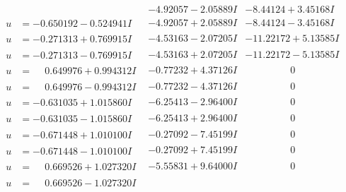 \documentclass[1p]{elsarticle_modified}
\theoremstyle{definition}
\begin{document}
$$\begin{array}{c|c|c}
 & -4.92057 - 2.05889 I & -8.44124 + 3.45168 I \\ \hline\begin{aligned}
u &= -0.650192 - 0.524941 I\end{aligned}
 & -4.92057 + 2.05889 I & -8.44124 - 3.45168 I \\ \hline\begin{aligned}
u &= -0.271313 + 0.769915 I\end{aligned}
 & -4.53163 - 2.07205 I & -11.22172 + 5.13585 I \\ \hline\begin{aligned}
u &= -0.271313 - 0.769915 I\end{aligned}
 & -4.53163 + 2.07205 I & -11.22172 - 5.13585 I \\ \hline\begin{aligned}
u &= \phantom{-}0.649976 + 0.994312 I\end{aligned}
 & -0.77232 + 4.37126 I & \phantom{-0.000000 } 0 \\ \hline\begin{aligned}
u &= \phantom{-}0.649976 - 0.994312 I\end{aligned}
 & -0.77232 - 4.37126 I & \phantom{-0.000000 } 0 \\ \hline\begin{aligned}
u &= -0.631035 + 1.015860 I\end{aligned}
 & -6.25413 - 2.96400 I & \phantom{-0.000000 } 0 \\ \hline\begin{aligned}
u &= -0.631035 - 1.015860 I\end{aligned}
 & -6.25413 + 2.96400 I & \phantom{-0.000000 } 0 \\ \hline\begin{aligned}
u &= -0.671448 + 1.010100 I\end{aligned}
 & -0.27092 - 7.45199 I & \phantom{-0.000000 } 0 \\ \hline\begin{aligned}
u &= -0.671448 - 1.010100 I\end{aligned}
 & -0.27092 + 7.45199 I & \phantom{-0.000000 } 0 \\ \hline\begin{aligned}
u &= \phantom{-}0.669526 + 1.027320 I\end{aligned}
 & -5.55831 + 9.64000 I & \phantom{-0.000000 } 0 \\ \hline\begin{aligned}
u &= \phantom{-}0.669526 - 1.027320 I\end{aligned}

\end{array}$$
\end{document}
